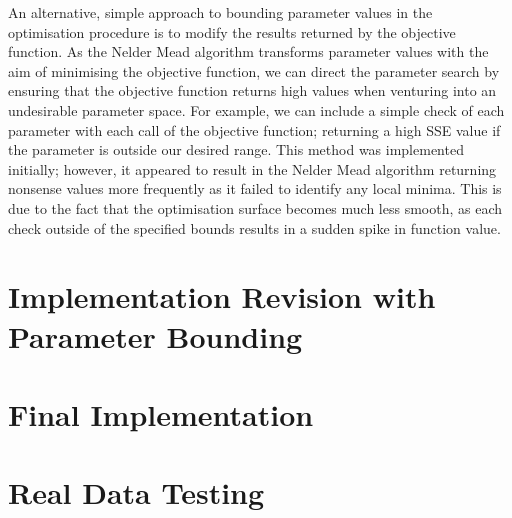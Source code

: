 An alternative, simple approach to bounding parameter values in the
optimisation procedure is to modify the results returned by the
objective function. As the Nelder Mead algorithm transforms parameter
values with the aim of minimising the objective function, we can
direct the parameter search by ensuring that the objective function
returns high values when venturing into an undesirable parameter
space. For example, we can include a simple check of each parameter
with each call of the objective function; returning a high SSE value
if the parameter is outside our desired range. This method was
implemented initially; however, it appeared to result in the Nelder
Mead algorithm returning nonsense values more frequently as it failed
to identify any local minima. This is due to the fact that the
optimisation surface becomes much less smooth, as each check outside
of the specified bounds results in a sudden spike in function value.  


\section{Implementation Revision with Parameter Bounding}


\section{Final Implementation}


\section{Real Data Testing}
